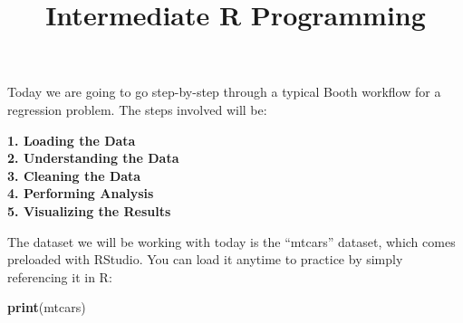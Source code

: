 \documentclass[]{article}
\title{Intermediate R Programming}
\author{}
\date{}
\newenvironment{Shaded}{\begin{snugshade}}{\end{snugshade}}
\newcommand{\KeywordTok}[1]{\textcolor[rgb]{0.13,0.29,0.53}{\textbf{#1}}}
\newcommand{\NormalTok}[1]{#1}
\begin{document}
\maketitle

Today we are going to go step-by-step through a typical Booth workflow
for a regression problem. The steps involved will be:

\textbf{1. Loading the Data}\\
\textbf{2. Understanding the Data}\\
\textbf{3. Cleaning the Data}\\
\textbf{4. Performing Analysis}\\
\textbf{5. Visualizing the Results}

The dataset we will be working with today is the ``mtcars'' dataset,
which comes preloaded with RStudio. You can load it anytime to practice
by simply referencing it in R:

\begin{Shaded}
\begin{Highlighting}[]
\KeywordTok{print}\NormalTok{(mtcars)}
\end{Highlighting}
\end{Shaded}
\end{document}
